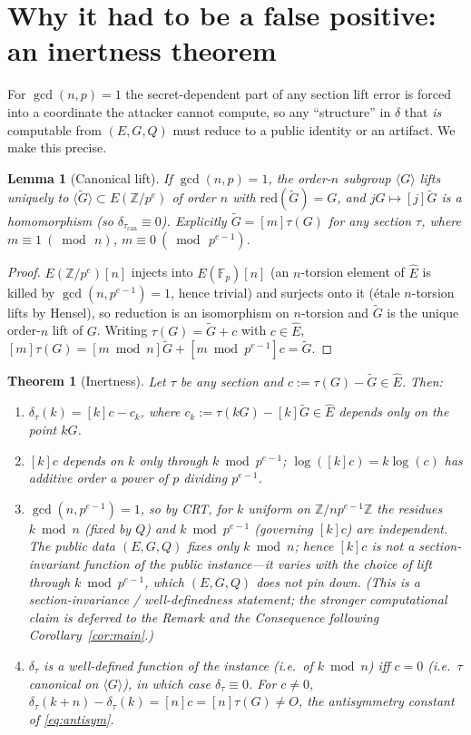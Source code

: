\documentclass[11pt]{article}
\newtheorem{theorem}{Theorem}
\newtheorem{lemma}{Lemma}
\theoremstyle{definition}
\newcommand{\Fp}{\mathbb{F}_p}
\newcommand{\Z}{\mathbb{Z}}
\newcommand{\Ehat}{\widehat{E}}
\newcommand{\red}{\mathrm{red}}
\begin{document}
\section{Why it had to be a false positive: an inertness theorem}
\label{sec:theorem}

For $\gcd(n,p)=1$ the secret-dependent part of any section lift error is
forced into a coordinate the attacker cannot compute, so any
``structure'' in $\delta$ that \emph{is} computable from $(E,G,Q)$ must
reduce to a public identity or an artifact. We make this precise.

\begin{lemma}[Canonical lift]\label{lem:can}
If $\gcd(n,p)=1$, the order-$n$ subgroup $\langle G\rangle$ lifts
uniquely to $\langle\widetilde G\rangle\subset E(\Z/p^e)$ of order $n$
with $\red(\widetilde G)=G$, and $jG\mapsto[j]\widetilde G$ is a
homomorphism (so $\delta_{\tau_{\mathrm{can}}}\equiv 0$). Explicitly
$\widetilde G=[m]\tau(G)$ for any section $\tau$, where
$m\equiv 1\ (\bmod\,n)$, $m\equiv 0\ (\bmod\,p^{e-1})$.
\end{lemma}

\begin{proof}
$E(\Z/p^e)[n]$ injects into $E(\Fp)[n]$ (an $n$-torsion element of
$\Ehat$ is killed by $\gcd(n,p^{e-1})=1$, hence trivial) and surjects
onto it (étale $n$-torsion lifts by Hensel), so reduction is an
isomorphism on $n$-torsion and $\widetilde G$ is the unique order-$n$
lift of $G$. Writing $\tau(G)=\widetilde G+c$ with $c\in\Ehat$,
$[m]\tau(G)=[m\bmod n]\widetilde G+[m\bmod p^{e-1}]c=\widetilde G$.
\end{proof}

\begin{theorem}[Inertness]\label{thm:main}
Let $\tau$ be any section and $c:=\tau(G)-\widetilde G\in\Ehat$. Then:
\begin{enumerate}
\item[(a)] $\delta_\tau(k)=[k]c-c_k$, where $c_k:=\tau(kG)-[k]\widetilde G
\in\Ehat$ depends only on the point $kG$.
\item[(b)] $[k]c$ depends on $k$ only through $k\bmod p^{e-1}$;
$\log([k]c)=k\log(c)$ has additive order a power of $p$ dividing
$p^{e-1}$.
\item[(c)] $\gcd(n,p^{e-1})=1$, so by CRT, for $k$ uniform on
$\Z/np^{e-1}\Z$ the residues $k\bmod n$ (fixed by $Q$) and $k\bmod
p^{e-1}$ (governing $[k]c$) are independent. The public data $(E,G,Q)$
fixes only $k\bmod n$; hence $[k]c$ is not a section-invariant function
of the public instance---it varies with the choice of lift through
$k\bmod p^{e-1}$, which $(E,G,Q)$ does not pin down. (This is a
section-invariance / well-definedness statement; the stronger
computational claim is deferred to the Remark and the Consequence
following Corollary~\ref{cor:main}.)
\item[(d)] $\delta_\tau$ is a well-defined function of the instance
(i.e.\ of $k\bmod n$) iff $c=0$ (i.e.\ $\tau$ canonical on
$\langle G\rangle$), in which case $\delta_\tau\equiv 0$. For $c\neq 0$,
$\delta_\tau(k+n)-\delta_\tau(k)=[n]c=[n]\tau(G)\neq O$, the antisymmetry
constant of \eqref{eq:antisym}.
\end{enumerate}
\end{theorem}
\end{document}
